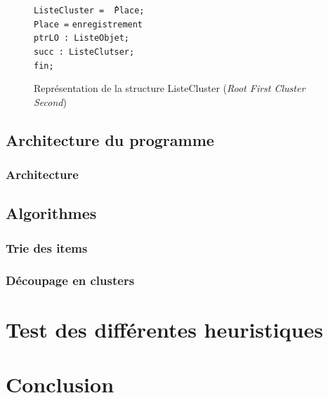 \documentclass[twoside,UTF8]{EPURapport}
\begin{document}
\begin{figure}[!h]

\begin{tabbing}
\texttt{ListeCluster = \^\,Place;} \\
\texttt{Place =} \= \texttt{enregistrement} \\
\> \texttt{ptrLO : ListeObjet;} \\
\> \texttt{succ : ListeClutser;} \\
\> \texttt{fin; } \\
\end{tabbing}

\caption{Représentation de la structure ListeCluster (\textit{Root First Cluster Second})}
\end{figure}

\section{Architecture du programme}

\subsection{Architecture}

\section{Algorithmes}

\subsection{Trie des items}

\subsection{Découpage en clusters}



\chapter{Test des différentes heuristiques}
\label{chap:test}

\chapter{Conclusion}

\end{document}
